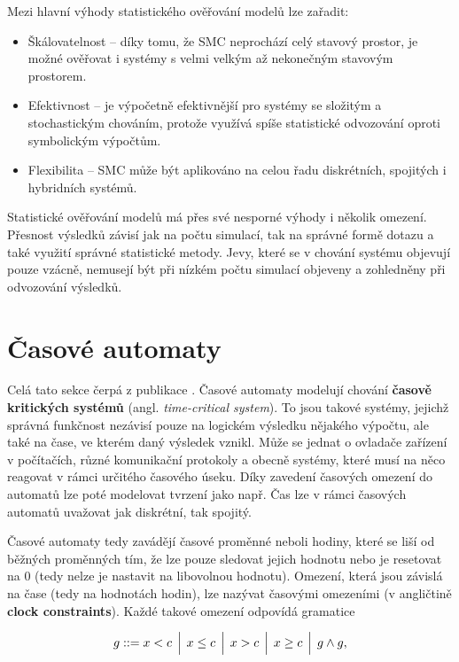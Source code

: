 Mezi hlavní výhody statistického ověřování modelů lze zařadit:
\begin{itemize}
    \item Škálovatelnost -- díky tomu, že SMC neprochází celý stavový prostor, je možné ověřovat i systémy s velmi velkým až nekonečným stavovým prostorem.
    \item Efektivnost -- je výpočetně efektivnější pro systémy se složitým a stochastickým chováním, protože využívá spíše statistické odvozování oproti symbolickým výpočtům.
    \item Flexibilita -- SMC může být aplikováno na celou řadu diskrétních, spojitých i hybridních systémů.
\end{itemize}

Statistické ověřování modelů má přes své nesporné výhody i několik omezení. Přesnost výsledků závisí jak na počtu simulací, tak na správné formě dotazu a také využití správné statistické metody. Jevy, které se v chování systému objevují pouze vzácně, nemusejí být při nízkém počtu simulací objeveny a zohledněny při odvozování výsledků.

\section{Časové automaty}
Celá tato sekce čerpá z publikace \cite{mc_principles}. Časové automaty modelují chování \textbf{časově kritických systémů} (angl. \textit{time-critical system}). To jsou takové systémy, jejichž správná funkčnost nezávisí pouze na logickém výsledku nějakého výpočtu, ale také na čase, ve kterém daný výsledek vznikl. Může se jednat o ovladače zařízení v počítačích, různé komunikační protokoly a obecně systémy, které musí na něco reagovat v rámci určitého časového úseku. Díky zavedení časových omezení do automatů lze poté modelovat tvrzení jako např.  Čas lze v rámci časových automatů uvažovat jak diskrétní, tak spojitý.

Časové automaty tedy zavádějí časové proměnné neboli hodiny, které se liší od běžných proměnných tím, že lze pouze sledovat jejich hodnotu nebo je resetovat na 0 (tedy nelze je nastavit na libovolnou hodnotu). Omezení, která jsou závislá na čase (tedy na hodnotách hodin), lze nazývat časovými omezeními (v angličtině \textbf{clock constraints}). Každé takové omezení odpovídá gramatice

\begin{equation*}
    g ::= x < c \hspace{0.15cm} \Big| \hspace{0.15cm} x \leq c \hspace{0.15cm} \Big| \hspace{0.15cm} x > c \hspace{0.15cm} \Big| \hspace{0.15cm} x \geq c \hspace{0.15cm} \Big| \hspace{0.15cm} g \wedge g,
\end{equation*}

